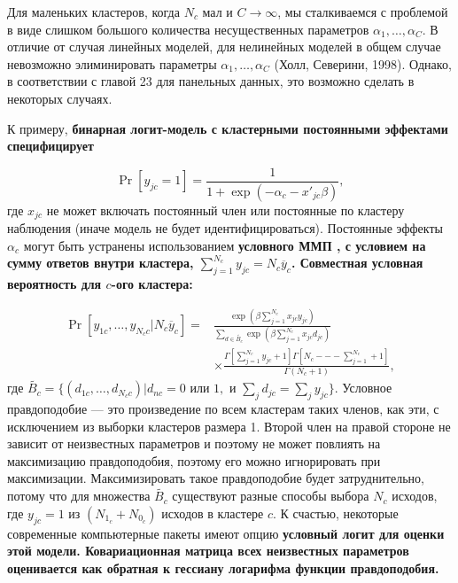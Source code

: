 Для маленьких кластеров, когда $N_c$ мал и $C \to \infty$, мы сталкиваемся с проблемой в виде слишком большого количества несущественных параметров $\alpha_1, \dots, \alpha_C$. В отличие от случая линейных моделей, для нелинейных моделей в общем случае невозможно элиминировать параметры $\alpha_1, \dots, \alpha_C$ (Холл, Северини, 1998). Однако, в соответствии с главой 23 для панельных данных, это возможно сделать в некоторых случаях. 

К примеру, \bfseries бинарная логит-модель с кластерными постоянными эффектами \mdseries специфицирует

\begin{equation}
\label{eq24.47}
\Pr[y_{jc} = 1] = \frac{1}{1+\exp(-\alpha_c -x'_{jc}\beta)},
\end{equation}
где $x_{jc}$ не может включать постоянный член или постоянные по кластеру наблюдения (иначе модель не будет идентифицироваться). Постоянные эффекты $\alpha_c$ могут быть устранены использованием \bfseries условного ММП \mdseries, с условием на сумму ответов внутри кластера, $\sum_{j=1}^{N_c} y_{jc} = N_c \overline{y}_c$. Совместная условная вероятность для $c$-ого кластера:

\begin{align}
\label{eq24.48}
\Pr[y_{1c}, \dots, y_{N_c c} | N_c \overline{y}_c] = & \frac{\exp(\beta \sum_{j=1}^{N_c} x_{jc} y_{jc})}{\sum_{d \in \widetilde{B_c}} \exp(\beta \sum_{j=1}^{N_c} x_{jc} d_{jc}) }  \nonumber\\
& \times \frac{\Gamma [\sum_{j=1}^{N_c} y_{jc} + 1] \Gamma [N_c --- \sum_{j=1}^{N_c} + 1] }{\Gamma (N_c+1)},
\end{align}
где $\widetilde{B_c} = \{ (d_{1c}, \dots, d_{N_c c}) | d_{nc} = 0 \text{ или } 1, \text{ и } \sum_j d_{jc} = \sum_j y_{jc} \}$. Условное правдоподобие --- это произведение по всем кластерам таких членов, как эти, с исключением из выборки кластеров размера 1. Второй член на правой стороне не зависит от неизвестных параметров и поэтому не может повлиять на максимизацию правдоподобия, поэтому его можно игнорировать при максимизации. Максимизировать такое правдоподобие будет затруднительно, потому что для множества $\widetilde{B_c}$ существуют разные способы выбора $N_c$ исходов, где $y_{jc} = 1$ из $(N_{1_c} + N_{0_c})$ исходов в кластере $c$. К счастью, некоторые современные компьютерные пакеты имеют опцию \bfseries условный логит \mdseries для оценки этой модели. Ковариационная матрица всех неизвестных параметров оценивается как обратная к гессиану логарифма функции правдоподобия. 

